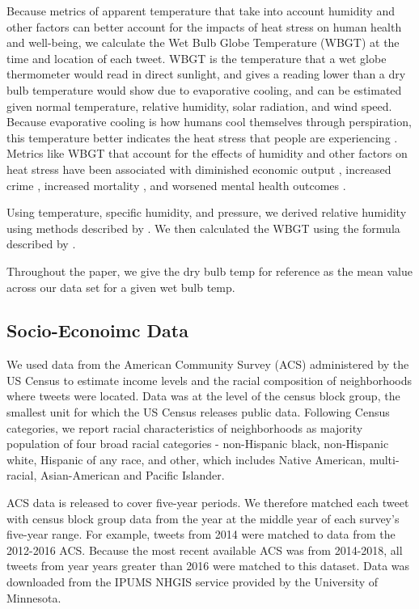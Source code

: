 \documentclass[fleqn,10pt]{wlscirep}
\begin{document}
Because metrics of apparent temperature that take into account humidity and other factors can better account for the impacts of heat stress on human health and well-being, we calculate the Wet Bulb Globe Temperature (WBGT) at the time and location of each tweet.  WBGT is the temperature that a wet globe thermometer would read in direct sunlight, and gives a reading lower than a dry bulb temperature would show due to evaporative cooling, and can be estimated given normal temperature, relative humidity, solar radiation, and wind speed.  Because evaporative cooling is how humans cool themselves through perspiration, this temperature better indicates the heat stress that people are experiencing \cite{budd2008wet}.  Metrics like WBGT that account for the effects of humidity and other factors on heat stress have been associated with diminished economic output \cite{rao2020projections}, increased crime \cite{hu2017impact}, increased mortality \cite{chien2016spatiotemporal, armstrong2019role}, and worsened mental health outcomes \cite{vida2012relationship, ding2016importance}.

Using temperature, specific humidity, and pressure, we derived relative humidity using methods described by  \cite{bolton_computation_1980}.  We then calculated the WBGT using the formula described by \cite{heo2019comparison}.

Throughout the paper, we give the dry bulb temp for reference as the mean value across our data set for a given wet bulb temp.

\subsection*{Socio-Econoimc Data}
We used data from the American Community Survey (ACS) administered by the US Census to estimate income levels and the racial composition of neighborhoods where tweets were located.  Data was at the level of the census block group, the smallest unit for which the US Census releases public data. Following Census categories, we report racial characteristics of neighborhoods as majority population of four broad racial categories - non-Hispanic black, non-Hispanic white, Hispanic of any race, and other, which includes Native American, multi-racial, Asian-American and Pacific Islander. 

ACS data is released to cover five-year periods.  We therefore matched each tweet with census block group data from the year at the middle year of each survey's five-year range.  For example, tweets from 2014 were matched to data from the 2012-2016 ACS.  Because the most recent available ACS was from 2014-2018, all tweets from year years greater than 2016 were matched to this dataset.  Data was downloaded from the IPUMS NHGIS service provided by the University of Minnesota.
\end{document}

